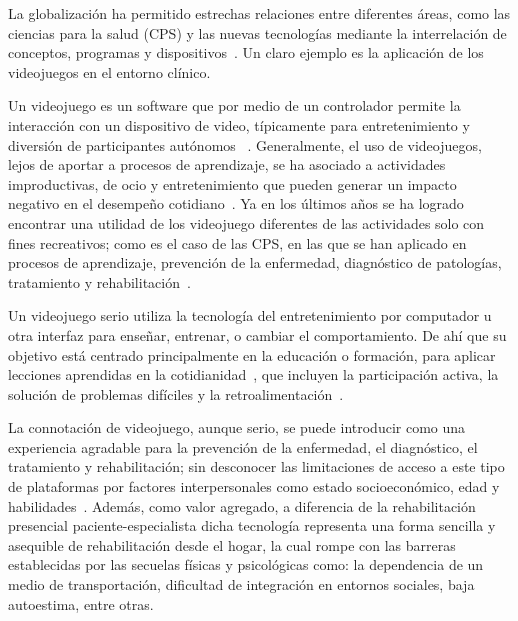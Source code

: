 \begin{introduction}
    \vspace{5pt} 
    La globalización ha permitido estrechas relaciones entre diferentes áreas, como las ciencias para la salud (CPS) y las nuevas tecnologías mediante la interrelación de conceptos, programas y dispositivos~\cite{federal2008older}. Un claro ejemplo es la aplicación de los videojuegos en el entorno clínico. 
    
    \vspace{5pt} 
    Un videojuego es un software que por medio de un controlador permite la interacción con un dispositivo de video, típicamente para entretenimiento y diversión de participantes autónomos ~\cite{studenski2010interactive, gomez2012videojuegos, gonzalez2016mooc}. Generalmente, el uso de videojuegos, lejos de aportar a procesos de aprendizaje, se ha asociado a actividades improductivas, de ocio y entretenimiento que pueden generar un impacto negativo en el desempeño cotidiano~\cite{maldonado2014videojuegos}. Ya en los últimos años se ha logrado encontrar una utilidad de los videojuego diferentes de las actividades solo con fines recreativos; como es el caso de las CPS, en las que se han aplicado en procesos de aprendizaje, prevención de la enfermedad, diagnóstico de patologías, tratamiento y rehabilitación~\cite{ladino2021uso}. 
    
    \vspace{5pt} Un videojuego serio utiliza la tecnología del entretenimiento por computador u otra interfaz para enseñar, entrenar, o cambiar el comportamiento. De ahí que su objetivo está centrado principalmente en la educación o formación, para aplicar lecciones aprendidas en la cotidianidad~\cite{graafland2014serious}, que incluyen la participación activa, la solución de problemas difíciles y la retroalimentación~\cite{gee2004learning}. 
    
    \vspace{5pt} La connotación de videojuego, aunque serio, se puede introducir como una experiencia agradable para la prevención de la enfermedad, el diagnóstico, el tratamiento y rehabilitación; sin desconocer las limitaciones de acceso a este tipo de plataformas por factores interpersonales como estado socioeconómico, edad y habilidades~\cite{ladino2021uso}. Además, como valor agregado, a diferencia de la rehabilitación presencial paciente-especialista dicha tecnología representa una forma sencilla y asequible de rehabilitación desde el hogar, la cual rompe con las barreras establecidas por las secuelas físicas y psicológicas como: la dependencia de un medio de transportación, dificultad de integración en entornos sociales, baja autoestima, entre otras. 
    

\end{introduction}
